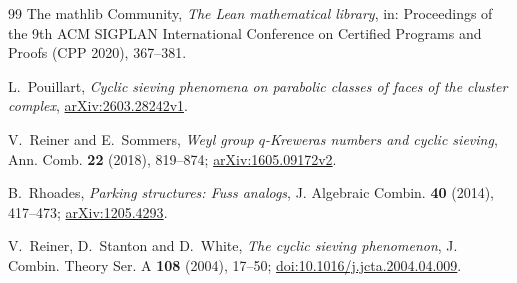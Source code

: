 \documentclass[11pt]{article}
\theoremstyle{definition}
\begin{document}
\begin{thebibliography}{99}
The mathlib Community, \emph{The Lean mathematical library}, in: Proceedings
of the 9th ACM SIGPLAN International Conference on Certified Programs and
Proofs (CPP 2020), 367--381.

L.~Pouillart, \emph{Cyclic sieving phenomena on parabolic classes of faces of
the cluster complex},
\href{https://arxiv.org/abs/2603.28242v1}{arXiv:2603.28242v1}.

V.~Reiner and E.~Sommers, \emph{Weyl group $q$-Kreweras numbers and cyclic
sieving}, Ann. Comb. \textbf{22} (2018), 819--874;
\href{https://arxiv.org/abs/1605.09172v2}{arXiv:1605.09172v2}.

B.~Rhoades, \emph{Parking structures: Fuss analogs}, J. Algebraic Combin.
\textbf{40} (2014), 417--473;
\href{https://arxiv.org/abs/1205.4293}{arXiv:1205.4293}.

V.~Reiner, D.~Stanton and D.~White, \emph{The cyclic sieving phenomenon},
J. Combin. Theory Ser. A \textbf{108} (2004), 17--50;
\href{https://doi.org/10.1016/j.jcta.2004.04.009}{doi:10.1016/j.jcta.2004.04.009}.

\end{thebibliography}
\end{document}

